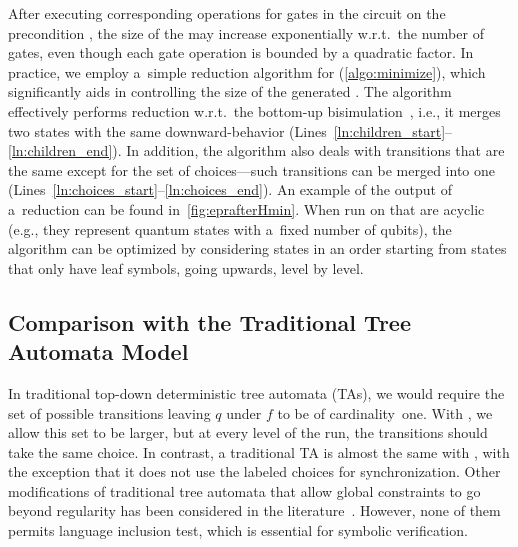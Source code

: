 After executing corresponding operations for gates in the circuit on the
precondition \lsta, the size of the \lsta may increase exponentially w.r.t.~the
number of gates, even though each gate operation is bounded by a quadratic
factor.
In practice, we employ a~simple reduction algorithm for \lstas
(\cref{algo:minimize}), which significantly aids in controlling the size of the generated \lstas.
The algorithm effectively performs reduction w.r.t.~the bottom-up
bisimulation~\cite{AbdullaHK07}, i.e., it merges two states with the same
downward-behavior (Lines~\ref{ln:children_start}--\ref{ln:children_end}).
In addition, the algorithm also deals with transitions that are the
same except for the set of choices---such transitions can be merged into one
(Lines~\ref{ln:choices_start}--\ref{ln:choices_end}).
An example of the output of a~reduction can be found in~\cref{fig:eprafterHmin}.
When run on \lstas that are acyclic (e.g., they represent quantum states with
a~fixed number of qubits), the algorithm can be optimized by considering states
in an order starting from states that only have leaf symbols, going upwards,
level by level.

\algMinimize   %


\vspace{-0.0mm}
\subsection{Comparison with the Traditional Tree Automata Model}
\vspace{-0.0mm}

In traditional top-down deterministic tree automata (TAs), we would require the set of possible
transitions leaving $q$ under $f$ to be of cardinality~one.
With \lstas, we allow this set to be larger, but at every level of the run, the transitions should take the same choice. In contrast, a traditional TA is almost the same with \lsta, with the exception that it does not use the labeled choices for synchronization. Other modifications of traditional tree automata that allow global constraints to go beyond
regularity has been considered in the literature~\cite{FiliotTT10,JacquemardKV09,JacquemardKV11,BogaertT92,SeidlR12}. However, none of them permits language inclusion test, which is essential for symbolic verification.


